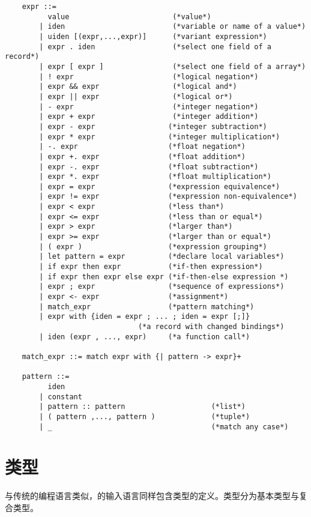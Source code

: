 \begin{center}
	\begin{verbatim}
	expr ::=
	      value                        (*value*)
	    | iden                         (*variable or name of a value*)
	    | uiden [(expr,...,expr)]      (*variant expression*)
	    | expr . iden                  (*select one field of a record*)
	    | expr [ expr ]                (*select one field of a array*)
	    | ! expr                       (*logical negation*)
	    | expr && expr                 (*logical and*)
	    | expr || expr                 (*logical or*)
	    | - expr                       (*integer negation*)
	    | expr + expr                  (*integer addition*)
	    | expr - expr                 (*integer subtraction*)
	    | expr * expr                 (*integer multiplication*)
	    | -. expr                     (*float negation*)
	    | expr +. expr                (*float addition*)
	    | expr -. expr                (*float subtraction*)
	    | expr *. expr                (*float multiplication*)
	    | expr = expr                 (*expression equivalence*)
	    | expr != expr                (*expression non-equivalence*)
	    | expr < expr                 (*less than*)
	    | expr <= expr                (*less than or equal*)
	    | expr > expr                 (*larger than*)
	    | expr >= expr                (*larger than or equal*)
	    | ( expr )                    (*expression grouping*)
	    | let pattern = expr          (*declare local variables*)
	    | if expr then expr           (*if-then expression*)
	    | if expr then expr else expr (*if-then-else expression *)
	    | expr ; expr                 (*sequence of expressions*)
	    | expr <- expr                (*assignment*)
	    | match_expr                  (*pattern matching*)
	    | expr with {iden = expr ; ... ; iden = expr [;]}  
	                           (*a record with changed bindings*)
	    | iden (expr , ..., expr)     (*a function call*)
	
	match_expr ::= match expr with {| pattern -> expr}+
	
	pattern ::= 
	      iden 
	    | constant
	    | pattern :: pattern                    (*list*)
	    | ( pattern ,..., pattern )             (*tuple*)
	    | _                                     (*match any case*)
	\end{verbatim}
\end{center}

\section{类型}
与传统的编程语言类似，\sctlprov{}的输入语言同样包含类型的定义。类型分为基本类型与复合类型。
